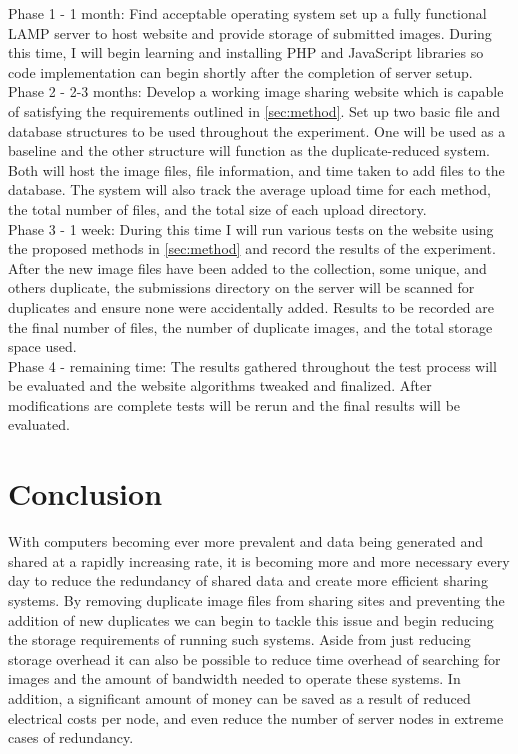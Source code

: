 \documentclass[11pt]{article}
\begin{document}
Phase 1 - 1 month: Find acceptable operating system set up a fully functional LAMP server to host website and provide storage of submitted images. During this time, I will begin learning and installing PHP and JavaScript libraries so code implementation can begin shortly after the completion of server setup.\\

Phase 2 - 2-3 months: Develop a working image sharing website which is capable of satisfying the requirements
outlined in \ref{sec:method}. Set up two basic file and database structures to be used throughout the experiment. One will be used as a baseline and the other structure will function as the duplicate-reduced system. Both will host the image files, file information, and time taken to add files to the database. The system will also track the average upload time for each method, the total number of files, and the total size of each upload directory.\\

Phase 3 - 1 week: During this time I will run various tests on the website using the proposed
methods in \ref{sec:method} and record the results of the experiment. After the new image files have been added to the collection, some unique, and others duplicate, the submissions directory on the server will be scanned for  duplicates and ensure none were accidentally added. Results to be recorded are the final number of files, the number of duplicate images, and the total storage space used.\\

Phase 4 - remaining time: The results gathered throughout the test process will be evaluated and
the website algorithms tweaked and finalized. After modifications are complete tests will be rerun and the
final results will be evaluated.
\vspace*{-.1in}
\section{Conclusion}
\label{sec:conclusion}
\vspace*{-.1in}


With computers becoming ever more prevalent and data being generated and shared at a rapidly increasing rate, it is becoming more and more necessary every day to reduce the redundancy of shared data and create more efficient sharing systems. By removing duplicate image files from sharing sites and preventing the addition of new duplicates we can begin to tackle this issue and begin reducing the storage requirements of running such systems. Aside from just reducing storage overhead it can also be possible to reduce time overhead of searching for images and the amount of bandwidth needed to operate these systems. In addition, a significant amount of money can be saved as a result of reduced electrical costs per node, and even reduce the number of server nodes in extreme cases of redundancy.

\newpage


\end{document}
